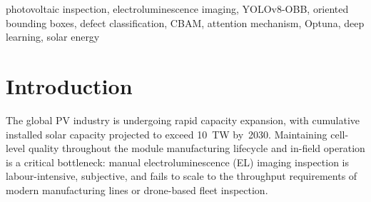 \documentclass[conference]{IEEEtran}
\newcommand{\tbd}[1][\,]{\textbf{[TBD#1]}}
\begin{document}
\begin{abstract}
Automated visual inspection of photovoltaic (PV) modules is
essential for large-scale solar farm quality control and
predictive maintenance, yet existing approaches are typically
evaluated only on pre-cropped, single-cell images and collapse
fine-grained defect taxonomies into coarse binary labels.
This paper proposes a two-stage pipeline (with a roadmap to
a third segmentation stage) that operates directly on
module-level electroluminescence (EL) imagery---including
full modules and partial or occluded captures---spanning both
monocrystalline and polycrystalline cell types.
Stage~1 performs cell extraction from raw module images
using YOLOv8-OBB (oriented bounding boxes), adopted after a
systematic evaluation of eleven classical OpenCV-based
approaches across two dataset tracks
(CellExtractOpenCV and FullModuleOpenCV), none of which
generalised robustly across module formats and imaging
conditions.
Stage~2 performs binary quality triage (OK vs.\ B-grade)
using CNN backbones (ResNet, EfficientNet) augmented with a
Convolutional Block Attention Module (CBAM), with
hyperparameters tuned via Optuna.
A third stage for pixel-level defect segmentation---using a
principled 29$\to$4 defect-class consolidation and a
comparison of convolutional (U-Net family) against
transformer-based (SegFormer) architectures---is under active
development.
We report \tbd{} mAP for Stage~1 cell extraction and
\tbd{} AUROC for Stage~2 triage.
\end{abstract}

\begin{IEEEkeywords}
photovoltaic inspection, electroluminescence imaging,
YOLOv8-OBB, oriented bounding boxes, defect classification,
CBAM, attention mechanism, Optuna, deep learning, solar energy
\end{IEEEkeywords}

\section{Introduction}

The global PV industry is undergoing rapid capacity expansion,
with cumulative installed solar capacity projected to exceed
10~TW by~2030. Maintaining cell-level quality throughout the
module manufacturing lifecycle and in-field operation is a
critical bottleneck: manual electroluminescence (EL) imaging
inspection is labour-intensive, subjective, and fails to scale
to the throughput requirements of modern manufacturing lines
or drone-based fleet inspection.
\end{document}
